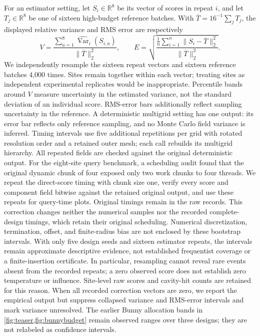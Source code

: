 For an estimator setting, let $S_i\in\mathbb R^8$ be its vector of scores in
repeat $i$, and let $T_j\in\mathbb R^8$ be one of sixteen high-budget reference
batches. With $\overline T=16^{-1}\sum_jT_j$, the displayed relative variance
and RMS error are respectively
\[
 V=\frac{\sum_{a=1}^8\widehat{\operatorname{Var}}_i(S_{i,a})}
         {\|\overline T\|_2^2},\qquad
 E=\sqrt{\frac{\frac1n\sum_{i=1}^n\|S_i-\overline T\|_2^2}
                    {\|\overline T\|_2^2}}.
\]
We independently resample the sixteen repeat vectors and sixteen reference
batches 4,000 times. Sites remain together within each vector; treating sites as
independent experimental replicates would be inappropriate. Percentile bands
around $V$ measure uncertainty in the estimated variance, not the standard
deviation of an individual score. RMS-error bars additionally reflect sampling
uncertainty in the reference. A deterministic multigrid setting has one output:
its error bar reflects only reference sampling, and no Monte Carlo field variance is inferred. Timing intervals use five
additional repetitions per grid with rotated resolution order and a retained
outer mesh; each call rebuilds its multigrid hierarchy. All repeated fields
are checked against the original deterministic output. For the eight-site
query benchmark, a scheduling audit found that the original dynamic chunk of
four exposed only two work chunks to four threads. We repeat the direct-score
timing with chunk size one, verify every score and component field bitwise
against the retained original output, and use these repeats for query-time
plots. Original timings remain in the raw records. This correction changes
neither the numerical samples nor the recorded complete-design timings, which
retain their original scheduling. Numerical discretization, termination, offset,
and finite-radius bias are not enclosed by these bootstrap intervals. With only
five design seeds and sixteen estimator repeats, the intervals remain
approximate descriptive evidence, not established frequentist coverage or a
finite-insertion certificate. In particular, resampling cannot reveal rare
events absent from the recorded repeats; a zero observed score does not
establish zero temperature or influence. Site-level raw scores and cavity-hit
counts are retained for this reason. When all recorded correction vectors
are zero, we report the empirical output but suppress collapsed variance and
RMS-error intervals and mark variance unresolved. The earlier Bunny allocation bands in
\cref{fig:teaser,fig:bunnybudget} remain observed ranges over three designs;
they are not relabeled as confidence intervals.

